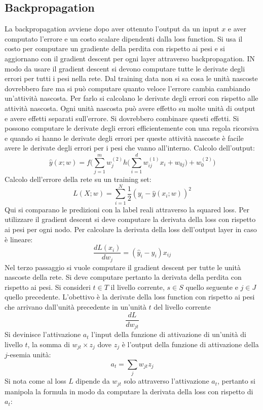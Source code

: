 	\subsection{Backpropagation}
	La backpropagation avviene dopo aver ottenuto l'output da un input $x$ e aver computato l'errore e un costo scalare dipendenti dalla loss function.
	Si usa il costo per computare un gradiente della perdita con rispetto ai pesi e si aggiornano con il gradient descent per ogni layer attraverso backpropagation.
	IN modo da usare il gradient descent si devono computare tutte le derivate degli errori per tutti i pesi nella rete.
	Dal training data non si sa cosa le unit\`a nascoste dovrebbero fare ma si pu\`o computare quanto veloce l'errore cambia cambiando un'attivit\`a nascosta.
	Per farlo si calcolano le derivate degli errori con rispetto alle attivit\`a nascosta.
	Ogni unit\`a nascosta pu\`o avere effetto su molte unit\`a di output e avere effetti separati sull'errore.
	Si dovrebbero combinare questi effetti.
	Si possono computare le derivate degli errori efficientemente con una regola ricorsiva e quando si hanno le derivate degli errori per queste attivit\`a nascoste \`e facile avere le derivate degli errori per i pesi che vanno all'interno.
	Calcolo dell'output:
	$$\hat{y}(x;w) = f\biggl(\sum\limits_{j = 1}^m w^{(2)}_j h\biggl(\sum\limits_{i = 1}^d w_{ij}^{(1)}x_i + w_{0j}\biggr)+w_0^{(2)}\biggr)$$
	Calcolo dell'errore della rete su un training set:
	$$L(X;w) = \sum\limits_{i=1}^N\frac{1}{2}(y_i-\hat{y}(x_i;w))^2$$
	Qui si comparano le predizioni con la label reali attraverso la squared loss.
	Per utilizzare il gradient descent si deve computare la derivata della loss con rispetto ai pesi per ogni nodo.
	Per calcolare la derivata della loss dell'output layer in caso \`e lineare:
	$$\frac{dL(x_i)}{dw_j}=(\hat{y}_i-y_i)x_{ij}$$
	Nel terzo passaggio si vuole computare il gradient descent per tutte le unit\`a nascoste della rete.
	Si deve computare pertanto la derivata della perdita con rispetto ai pesi.
	Si consideri $t\in T$ il livello corrente, $s\in S$ quello seguente e $j\in J$ quello precedente.
	L'obettivo \`e la derivate della loss function con rispetto ai pesi che arrivano dall'unit\`a precedente in un'unit\`a $t$ del livello corrente
	$$\frac{dL}{dw_{jt}}$$
	Si devinisce l'attivazione $a_t$ l'input della funzione di attivazione di un'unit\`a di livello $t$, la somma di $w_{jt}\times z_j$ dove $z_j$ \`e l'output della funzione di attivazione della $j$-esemia unit\`a:
	$$a_t = \sum_j w_{jt}z_j$$
	Si nota come al loss $L$ dipende da $w_{jt}$ solo attraverso l'attivazione $a_t$, pertanto si manipola la formula in modo da computare la derivata della loss con rispetto di $a_t$:
